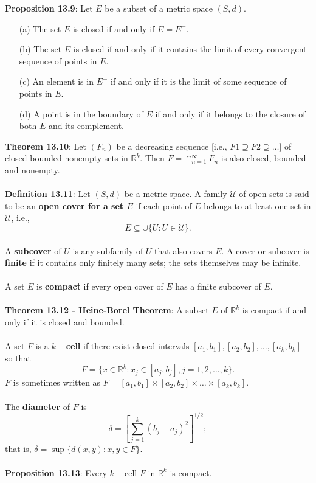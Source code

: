 \documentclass{article}
\theoremstyle{definition}
\DeclareMathOperator{\Sup}{sup}
\begin{document}
\textbf{Proposition 13.9}: Let $E$ be a subset of a metric space $(S, d)$. \begin{enumerate}
    \item[(a)] The set $E$ is closed if and only if $E = E^-$.
    \item[(b)] The set $E$ is closed if and only if it contains the limit of every convergent sequence of points in $E$.
    \item[(c)] An element is in $E^-$ if and only if it is the limit of some sequence of points in $E$.
    \item[(d)] A point is in the boundary of $E$ if and only if it belongs to the closure of both $E$ and its complement.
\end{enumerate} $ $ \\
\textbf{Theorem 13.10}: Let $(F_n)$ be a decreasing sequence [i.e., $F1 \supseteq F2 \supseteq \dots$] of closed bounded nonempty sets in $\mathbb{R}^k$. Then $F = \cap_{n = 1}^\infty F_n$ is also closed,
bounded and nonempty. \\ \\
\textbf{Definition 13.11}: Let $(S, d)$ be a metric space. A family $\mathcal{U}$ of open sets is said to be an \textbf{open cover for a set $E$} if each point of $E$ belongs to at least one set in $\mathcal{U}$, i.e., $$E \subseteq \cup \{U : U \in \mathcal{U}\}.$$ \\
A \textbf{subcover} of $U$ is any subfamily of $U$ that also covers $E$. A cover or subcover is \textbf{finite} if it contains only finitely many sets; the sets themselves may be infinite. \\ \\
A set $E$ is \textbf{compact} if every open cover of $E$ has a finite subcover of $E$. \\ \\
\textbf{Theorem 13.12 - Heine-Borel Theorem}: A subset $E$ of $\mathbb{R}^k$ is compact if and only if it is closed and bounded. \\ \\
A set $F$ is a \textbf{$k-$cell} if there exist closed intervals $[a_1, b_1], [a_2, b_2], \dots, [a_k, b_k]$ so that \\ $$F = \{x \in \mathbb{R}^k : x_j \in [a_j, b_j], j = 1, 2, \dots, k\}.$$ $F$ is sometimes written as $F = [a_1, b_1] \times [a_2, b_2] \times \dots \times [a_k, b_k]$. \\ \\
The \textbf{diameter} of $F$ is $$\delta = \left[ \sum_{j = 1}^k (b_j - a_j)^2\right]^{1/2};$$ that is, $\delta = \Sup \{d(x, y) : x, y \in F\}.$ \\ \\
\textbf{Proposition 13.13}: Every $k-$cell $F$ in $\mathbb{R}^k$ is compact.
\end{document}
